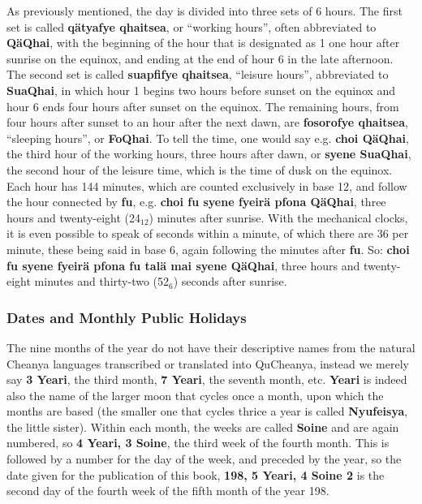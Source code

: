 \documentclass{article}
\begin{document}
As previously mentioned, the day is divided into three sets of 6 hours.  The first set is called \textbf{q\"atyafye qhaitsea}, or ``working hours'', often abbreviated to \textbf{Q\"aQhai}, with the beginning of the hour that is designated as 1 one hour after sunrise on the equinox, and ending at the end of hour 6 in the late afternoon.  The second set is called \textbf{suapfifye qhaitsea}, ``leisure hours'', abbreviated to \textbf{SuaQhai}, in which hour 1 begins two hours before sunset on the equinox and hour 6 ends four hours after sunset on the equinox.  The remaining hours, from four hours after sunset to an hour after the next dawn, are \textbf{fosorofye qhaitsea}, ``sleeping hours'', or \textbf{FoQhai}.  To tell the time, one would say e.g. \textbf{choi Q\"aQhai}, the third hour of the working hours, three hours after dawn, or \textbf{syene SuaQhai}, the second hour of the leisure time, which is the time of dusk on the equinox.  Each hour has 144 minutes, which are counted exclusively in base 12, and follow the hour connected by \textbf{fu}, e.g. \textbf{choi fu syene fyeir\"a pfona Q\"aQhai}, three hours and twenty-eight (24$_{12}$) minutes after sunrise.  With the mechanical clocks, it is even possible to speak of seconds within a minute, of which there are 36 per minute, these being said in base 6, again following the minutes after \textbf{fu}.  So: \textbf{choi fu syene fyeir\"a pfona fu tal\"a mai syene Q\"aQhai}, three hours and twenty-eight minutes and thirty-two (52$_6$) seconds after sunrise.

\subsubsection{Dates and Monthly Public Holidays}

The nine months of the year do not have their descriptive names from the natural Cheanya languages transcribed or translated into QuCheanya, instead we merely say \textbf{3 Yeari}, the third month, \textbf{7 Yeari}, the seventh month, etc.  \textbf{Yeari} is indeed also the name of the larger moon that cycles once a month, upon which the months are based (the smaller one that cycles thrice a year is called \textbf{Nyufeisya}, the little sister).  Within each month, the weeks are called \textbf{Soine} and are again numbered, so \textbf{4 Yeari, 3 Soine}, the third week of the fourth month.  This is followed by a number for the day of the week, and preceded by the year, so the date given for the publication of this book, \textbf{198, 5 Yeari, 4 Soine 2} is the second day of the fourth week of the fifth month of the year 198.
\end{document}
